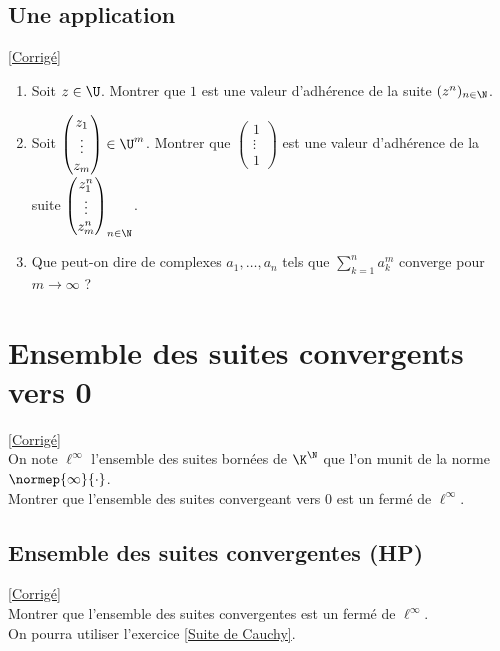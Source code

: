 \documentclass{book}
\begin{document}
\subsection{Une application }
\label{Une application}
\textcolor{blue}{\hyperref[sec:une-application]{[Corrigé]}}\\
\begin{enumerate}
	\item Soit $z\in \U$. Montrer que $1$ est une valeur d'adhérence de la suite $(z^n)_{n\in \N}$.
	\item Soit $\begin{pmatrix}z_1\\\vdots\\z_m\end{pmatrix}\in \U^m$. Montrer que $\begin{pmatrix}1\\\vdots\\1\end{pmatrix}$ est une valeur d'adhérence de la suite $\begin{pmatrix}z_1^n\\\vdots\\z_m^n\end{pmatrix}_{n\in \N}$.
	\item Que peut-on dire de complexes $a_1,\dots,a_n$ tels que $\displaystyle\sum_{k=1}^na_k^m$ converge pour $m\to\infty$ ?
\end{enumerate}

\section{Ensemble des suites convergents vers 0 }
\label{Ensemble des suites convergents vers 0}
\textcolor{blue}{\hyperref[sec:ensemble-des-suites-convergents-vers-0]{[Corrigé]}}\\
On note $\ell^\infty$ l'ensemble des suites bornées de $\K^\N$ que l'on munit de la norme $\normep{\infty}{\cdot}$.\\
Montrer que l'ensemble des suites convergeant vers $0$ est un fermé de $\ell^\infty$.

\subsection{Ensemble des suites convergentes  (HP)}
\label{Ensemble des suites convergentes}
\textcolor{blue}{\hyperref[sec:ensemble-des-suites-convergentes]{[Corrigé]}}\\
Montrer que l'ensemble des suites convergentes est un fermé de $\ell^\infty$.\\
On pourra utiliser l'exercice \ref{Suite de Cauchy}.
\end{document}
